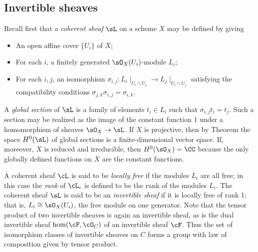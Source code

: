 \subsection{Invertible sheaves}\label{Invertible sheaves}

Recall first that a \emph{coherent sheaf} $\sL$ on a scheme $X$ may be defined by
giving 
\begin{itemize}
 \item An open affine cover $\{U_{i}\}$ of $X$; 
 \item For each $i$, a finitely generated $\sO_{X}(U_{i})$-module $L_{i}$;
 \item For each $i,j$, an isomorphism $\sigma_{i,j}: L_{i}\mid_{U_{i}\cap U_{j}} \to L_{j}\mid_{U_{i}\cap U_{j}}$
 satisfying the compatibility conditions $\sigma_{j,k}\sigma_{i,j} = \sigma_{i,k}$. 
 \end{itemize}

A \emph{global section} of $\sL$ is a family of elements $t_{i}\in L_{i}$ such that 
$\sigma_{i,j} t_{i} = t_{j}$. Such a section may be realized as the image of the constant function 1 under
a homomorphism of sheaves $\sO_{X} \to \sL$. If $X$ is projective, then 
by Theorem \cite[Thm III.5.2]{H} the space $H^{0}(\sL)$  of global sections is
a finite-dimensional vector space. If, moreover, $X$ is reduced and irreducible, then $H^{0}(\sO_{X}) = \CC$ because the only globally defined
functions on $X$ are the constant functions.

A coherent sheaf $\cL$ is said to be \emph{locally free} if the modules $L_i$ are all free; in this case the \emph{rank} of $\cL_i$ is defined to be the rank of the modules $L_i$.
The coherent sheaf $\sL$ is said to be an \emph{invertible sheaf} if it is locally free of rank 1; that is, $L_{i} \cong \sO_X(U_{i})$, the free module on one generator. Note that the tensor product of two invertible sheaves is  again an invertible sheaf, as is the dual invertible sheaf $\hom(\cF, \cO_C)$ of an invertible sheaf $\cF$. Thus the set of isomorphism classes of invertible sheaves on $C$ forms a group with law of composition given by tensor product.

